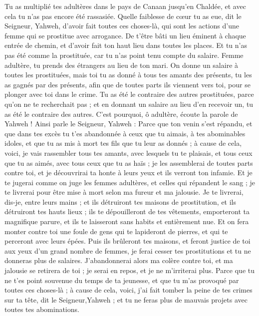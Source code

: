 \begin{multicols}{2}
Tu as multiplié tes adultères dans le pays de Canaan jusqu'en Chaldée, et avec cela tu n'as pas encore été rassasiée.
Quelle faiblesse de cœur tu as eue, dit le Seigneur, Yahweh, d'avoir fait toutes ces choses-là, qui sont les actions d'une femme qui se prostitue avec arrogance.
De t'être bâti un lieu éminent à chaque entrée de chemin, et d'avoir fait ton haut lieu dans toutes les places. Et tu n'as pas été comme la prostituée, car tu n'as point tenu compte du salaire.
Femme adultère, tu prends des étrangers au lieu de ton mari.
On donne un salaire à toutes les prostituées, mais toi tu as donné à tous tes amants des présents, tu les as gagnés par des présents, afin que de toutes parts ils viennent vers toi, pour se plonger avec toi dans le crime.
Tu as été le contraire des autres prostituées, parce qu'on ne te recherchait pas ; et en donnant un salaire au lieu d'en recevoir un, tu as été le contraire des autres.
C'est pourquoi, ô adultère, écoute la parole de Yahweh !
Ainsi parle le Seigneur, Yahweh : Parce que ton venin s'est répandu, et que dans tes excès tu t'es abandonnée à ceux que tu aimais, à tes abominables idoles, et que tu as mis à mort tes fils que tu leur as donnés ;
à cause de cela, voici, je vais rassembler tous tes amants, avec lesquels tu te plaisais, et tous ceux que tu as aimés, avec tous ceux que tu as haïs ; je les assemblerai de toutes parts contre toi, et je découvrirai ta honte à leurs yeux et ils verront ton infamie.
Et je te jugerai comme on juge les femmes adultères, et celles qui répandent le sang ; je te livrerai pour être mise à mort selon ma fureur et ma jalousie.
Je te livrerai, dis-je, entre leurs mains ; et ils détruiront tes maisons de prostitution, et ils détruiront tes hauts lieux ; ils te dépouilleront de tes vêtements, emporteront ta magnifique parure, et ils te laisseront sans habits et entièrement nue.
Et on fera monter contre toi une foule de gens qui te lapideront de pierres, et qui te perceront avec leurs épées.
Puis ils brûleront tes maisons, et feront justice de toi aux yeux d'un grand nombre de femmes, je ferai cesser tes prostitutions et tu ne donneras plus de salaires.
J'abandonnerai alors ma colère contre toi, et ma jalousie se retirera de toi ; je serai en repos, et je ne m'irriterai plus.
Parce que tu ne t'es point souvenue du temps de ta jeunesse, et que tu m'as provoqué par toutes ces choses-là ; à cause de cela, voici, j'ai fait tomber la peine de tes crimes sur ta tête, dit le Seigneur,Yahweh ; et tu ne feras plus de mauvais projets avec toutes tes abominations.

\end{multicols}
